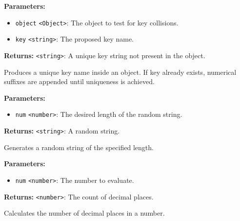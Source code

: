 \documentclass[12pt,a4paper]{article}
\begin{document}
\noindent \textbf{Parameters:}
\begin{itemize}
  \item \texttt{object} \texttt{<Object>}: The object to test for key collisions.
  \item \texttt{key} \texttt{<string>}: The proposed key name.
\end{itemize}

\noindent \textbf{Returns:} \texttt{<string>}: A unique key string not present in the object.

\noindent Produces a unique key name inside an object. If \textasciigrave{}key\textasciigrave{} already exists,
numerical suffixes are appended until uniqueness is achieved.

\vspace{5mm}
\noindent {}


\noindent \textbf{Parameters:}
\begin{itemize}
  \item \texttt{num} \texttt{<number>}: The desired length of the random string.
\end{itemize}

\noindent \textbf{Returns:} \texttt{<string>}: A random string.

\noindent Generates a random string of the specified length.

\vspace{5mm}
\noindent {}


\noindent \textbf{Parameters:}
\begin{itemize}
  \item \texttt{num} \texttt{<number>}: The number to evaluate.
\end{itemize}

\noindent \textbf{Returns:} \texttt{<number>}: The count of decimal places.

\noindent Calculates the number of decimal places in a number.

\vspace{5mm}
\noindent {}
\end{document}
